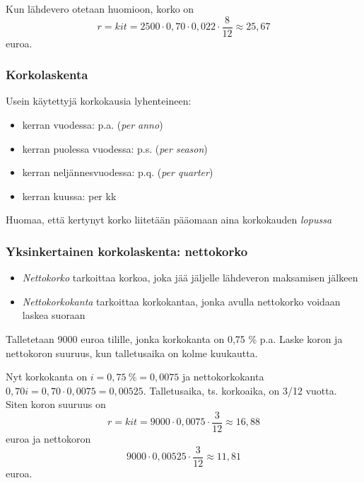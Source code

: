 \documentclass[]{beamer}
\begin{document}
\begin{frame}
    \pause
    \begin{ratkaisu}
        Kun lähdevero otetaan huomioon, korko on
         \[
            r = kit = 2500\cdot 0,70\cdot 0,022 \cdot \frac{8}{12}\approx 25,67
         \]
         euroa.
    \end{ratkaisu}
\end{frame}

\begin{frame}
    \frametitle{Korkolaskenta}
    \pause Usein käytettyjä korkokausia lyhenteineen:
    \begin{itemize}
        \item kerran vuodessa: p.a. (\emph{per anno}) \pause
        \item kerran puolessa vuodessa: p.s. (\emph{per season}) \pause
        \item kerran neljännesvuodessa: p.q. (\emph{per quarter}) \pause
        \item kerran kuussa: per kk \pause
    \end{itemize}
    Huomaa, että kertynyt korko liitetään pääomaan aina korkokauden \emph{lopussa}
\end{frame}


\begin{frame}
    \frametitle{Yksinkertainen korkolaskenta: nettokorko}
    \pause
    \begin{itemize}
        \item \emph{Nettokorko} tarkoittaa korkoa, joka jää jäljelle lähdeveron maksamisen jälkeen
        \item \emph{Nettokorkokanta} tarkoittaa korkokantaa, jonka avulla nettokorko voidaan laskea suoraan
    \end{itemize}
    \pause
    \begin{esim}
        Talletetaan 9000 euroa tilille, jonka korkokanta on 0,75 \% p.a.
        \pause Laske koron ja nettokoron suuruus, kun talletusaika on kolme kuukautta.
    \end{esim}
    \pause
\end{frame}

\begin{frame}
    \begin{ratkaisu}
        Nyt korkokanta on \pause $i = 0{,}75 \ \%  = 0{,}0075$ ja nettokorkokanta \pause $0{,}70i = 0{,}70 \cdot 0{,}0075 = 0,00525$.
        Talletusaika, ts. korkoaika, on 3/12 vuotta. Siten koron suuruus on
        \[
            r = kit = 9000\cdot 0,0075\cdot \frac{3}{12}\approx 16,88
        \]
        euroa ja nettokoron
        \[
            9000\cdot 0,00525\cdot\frac{3}{12}\approx 11,81
        \]
        euroa.
    \end{ratkaisu}
\end{frame}
\end{document}
